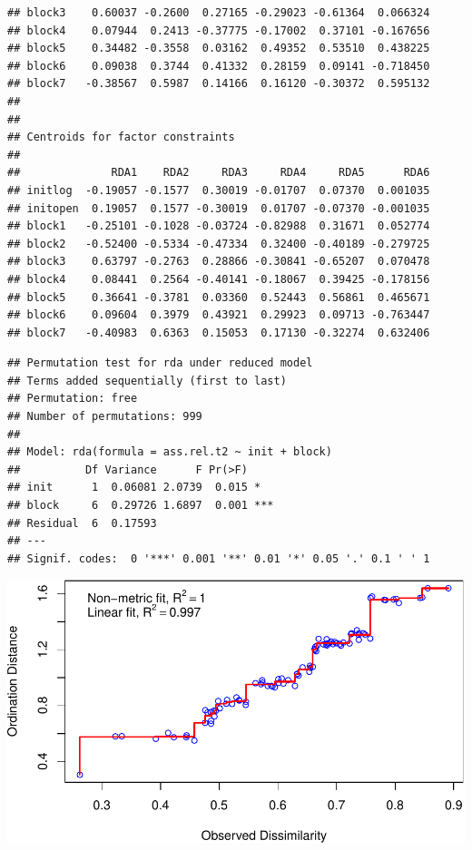 \documentclass[
]{article}
\begin{document}
\begin{verbatim}
## block3    0.60037 -0.2600  0.27165 -0.29023 -0.61364  0.066324
## block4    0.07944  0.2413 -0.37775 -0.17002  0.37101 -0.167656
## block5    0.34482 -0.3558  0.03162  0.49352  0.53510  0.438225
## block6    0.09038  0.3744  0.41332  0.28159  0.09141 -0.718450
## block7   -0.38567  0.5987  0.14166  0.16120 -0.30372  0.595132
## 
## 
## Centroids for factor constraints
## 
##              RDA1    RDA2     RDA3     RDA4     RDA5      RDA6
## initlog  -0.19057 -0.1577  0.30019 -0.01707  0.07370  0.001035
## initopen  0.19057  0.1577 -0.30019  0.01707 -0.07370 -0.001035
## block1   -0.25101 -0.1028 -0.03724 -0.82988  0.31671  0.052774
## block2   -0.52400 -0.5334 -0.47334  0.32400 -0.40189 -0.279725
## block3    0.63797 -0.2763  0.28866 -0.30841 -0.65207  0.070478
## block4    0.08441  0.2564 -0.40141 -0.18067  0.39425 -0.178156
## block5    0.36641 -0.3781  0.03360  0.52443  0.56861  0.465671
## block6    0.09604  0.3979  0.43921  0.29923  0.09713 -0.763447
## block7   -0.40983  0.6363  0.15053  0.17130 -0.32274  0.632406
\end{verbatim}

\begin{verbatim}
## Permutation test for rda under reduced model
## Terms added sequentially (first to last)
## Permutation: free
## Number of permutations: 999
## 
## Model: rda(formula = ass.rel.t2 ~ init + block)
##          Df Variance      F Pr(>F)    
## init      1  0.06081 2.0739  0.015 *  
## block     6  0.29726 1.6897  0.001 ***
## Residual  6  0.17593                  
## ---
## Signif. codes:  0 '***' 0.001 '**' 0.01 '*' 0.05 '.' 0.1 ' ' 1
\end{verbatim}

\includegraphics{log-project-aubrie-winnie_files/figure-latex/unnamed-chunk-13-1.pdf}
\end{document}
